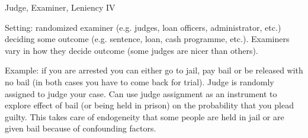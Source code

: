 \begin{frame}{Judge, Examiner, Leniency IV}

    Setting: randomized examiner (e.g. judges, loan officers, administrator, etc.) deciding some outcome (e.g. sentence, loan, cash programme, etc.). Examiners vary in how they decide outcome (some judges are nicer than others).

    \vspace{2em}

    Example: if you are arrested you can either go to jail, pay bail or be released with no bail (in both cases you have to come back for trial). Judge is randomly assigned to judge your case. Can use judge assignment as an instrument to explore effect of bail (or being held in prison) on the probability that you plead guilty. This takes care of endogeneity that some people are held in jail or are given bail because of confounding factors.
    
\end{frame}